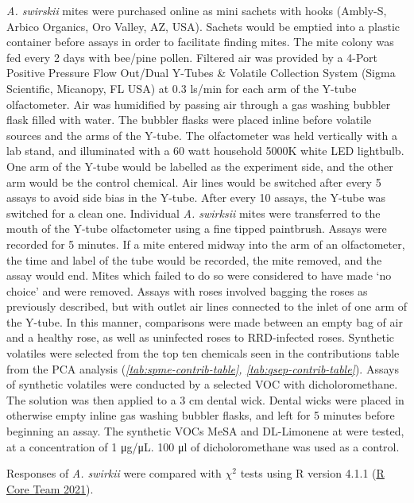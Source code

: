 \documentclass[12pt,final,CPage]{ufthesis}
\begin{document}
{  \emph{A. swirskii} mites were purchased online as mini sachets with hooks (Ambly-S, Arbico Organics, Oro Valley, AZ, USA). Sachets would be emptied into a plastic container before assays in order to facilitate finding mites. The mite colony was fed every 2 days with bee/pine pollen. Filtered air was provided by a 4-Port Positive Pressure Flow Out/Dual Y-Tubes \& Volatile Collection System (Sigma Scientific, Micanopy, FL USA) at 0.3 \si{\litre}s/min for each arm of the Y-tube olfactometer. Air was humidified by passing air through a gas washing bubbler flask filled with water. The bubbler flasks were placed inline before volatile sources and the arms of the Y-tube. The olfactometer was held vertically with a lab stand, and illuminated with a 60 watt household 5000K white LED lightbulb. One arm of the Y-tube would be labelled as the experiment side, and the other arm would be the control chemical. Air lines would be switched after every 5 assays to avoid side bias in the Y-tube. After every 10 assays, the Y-tube was switched for a clean one. Individual \emph{A. swirksii} mites were transferred to the mouth of the Y-tube olfactometer using a fine tipped paintbrush. Assays were recorded for 5 minutes. If a mite entered midway into the arm of an olfactometer, the time and label of the tube would be recorded, the mite removed, and the assay would end. Mites which failed to do so were considered to have made `no choice' and were removed. Assays with roses involved bagging the roses as previously described, but with outlet air lines connected to the inlet of one arm of the Y-tube. In this manner, comparisons were made between an empty bag of air and a healthy rose, as well as uninfected roses to RRD-infected roses. Synthetic volatiles were selected from the top ten chemicals seen in the contributions table from the PCA analysis (\emph{\ref{tab:spme-contrib-table}, \ref{tab:qsep-contrib-table}}). Assays of synthetic volatiles were conducted by a selected VOC with dicholoromethane. The solution was then applied to a 3 \si{\centi\metre} dental wick. Dental wicks were placed in otherwise empty inline gas washing bubbler flasks, and left for 5 minutes before beginning an assay. The synthetic VOCs MeSA and DL-Limonene at were tested, at a concentration of 1 \si{\micro\gram}/\si{\micro\liter}. 100 \si{\micro\litre} of dicholoromethane was used as a control.

  Responses of \emph{A. swirkii} were compared with \(\chi^2\) tests using R version 4.1.1 (\protect\hyperlink{ref-RCT2021}{R Core Team 2021}).

}
\end{document}
